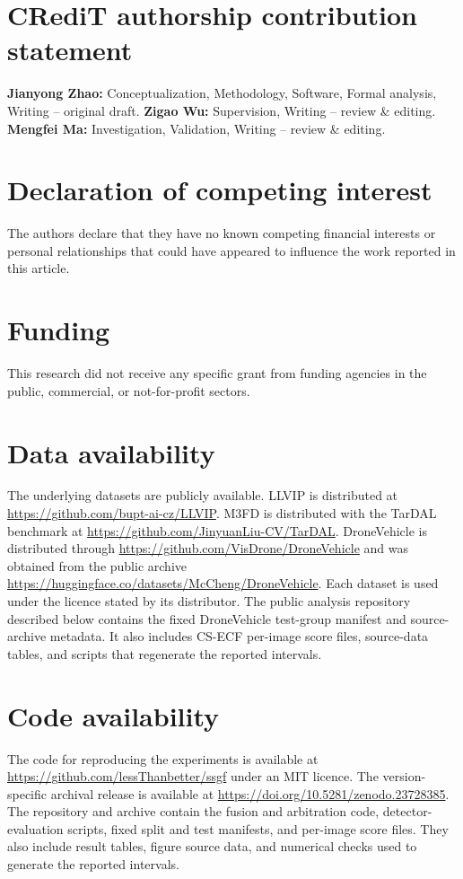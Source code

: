 \documentclass[preprint,11pt]{elsarticle}
\begin{document}
\section*{CRediT authorship contribution statement}

\textbf{Jianyong Zhao:} Conceptualization, Methodology, Software, Formal
analysis, Writing -- original draft. \textbf{Zigao Wu:} Supervision, Writing
-- review \& editing. \textbf{Mengfei Ma:} Investigation, Validation,
Writing -- review \& editing.

\section*{Declaration of competing interest}

The authors declare that they have no known competing financial interests or
personal relationships that could have appeared to influence the work reported
in this article.

\section*{Funding}

This research did not receive any specific grant from funding agencies in the
public, commercial, or not-for-profit sectors.

\section*{Data availability}

The underlying datasets are publicly available. LLVIP is distributed at
\url{https://github.com/bupt-ai-cz/LLVIP}. M3FD is distributed with the TarDAL
benchmark at \url{https://github.com/JinyuanLiu-CV/TarDAL}. DroneVehicle is
distributed through \url{https://github.com/VisDrone/DroneVehicle} and was
obtained from the public archive
\url{https://huggingface.co/datasets/McCheng/DroneVehicle}. Each dataset is used
under the licence stated by its distributor. The public analysis repository
described below contains the fixed DroneVehicle test-group manifest and
source-archive metadata. It also includes CS-ECF per-image score files,
source-data tables, and scripts that regenerate the reported intervals.

\section*{Code availability}

The code for reproducing the experiments is available at
\url{https://github.com/lessThanbetter/ssgf} under an MIT licence. The
version-specific archival release is available at
\url{https://doi.org/10.5281/zenodo.23728385}. The repository and archive contain
the fusion and arbitration code, detector-evaluation scripts, fixed split and
test manifests, and per-image score files. They also include result tables,
figure source data, and numerical checks used to generate the reported
intervals.
\end{document}
